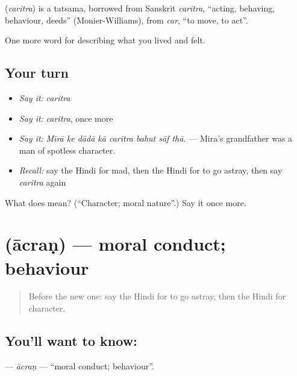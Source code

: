 \begin{cousinweb}
\textbf{} (\emph{caritra}) is a tatsama, borrowed from Sanskrit \emph{caritra}, \textquotedblleft{}acting, behaving, behaviour, deeds\textquotedblright{} (Monier-Williams), from \emph{car}, \textquotedblleft{}to move, to act\textquotedblright{}.
\end{cousinweb}

\begin{grammarlens}[title={What you've built}]
One more word for describing what you lived and felt.
\end{grammarlens}

\subsection*{Your turn}
\begin{itemize}
\raggedright
  \item \emph{Say it:} \emph{caritra}
  \item \emph{Say it:} \emph{caritra}, once more
  \item \emph{Say it:} \emph{Mīrā ke dādā kā caritra bahut sāf thā.} — Mira's grandfather was a man of spotless character.
  \item \emph{Recall:} say the Hindi for mad, then the Hindi for to go astray, then say \emph{caritra} again
\end{itemize}

\begin{tcolorbox}[breakable,colback=teal!4,colframe=teal!35!black,title={Before you move on}]
What does  mean? (\textquotedblleft{}Character; moral nature\textquotedblright{}.) Say it once more.
\end{tcolorbox}
\section[\texorpdfstring{\hi{आचरण} (ācraṇ)}{आचरण (ācraṇ)}]{ (ācraṇ) — moral conduct; behaviour}

\label{lesson:HI-C475-acran}



\begin{quote}
Before the new one: say the Hindi for to go astray, then the Hindi for character.
\end{quote}

\subsection*{You'll want to know: }
\textbf{} — \emph{ācraṇ} — \textquotedblleft{}moral conduct; behaviour\textquotedblright{}.

